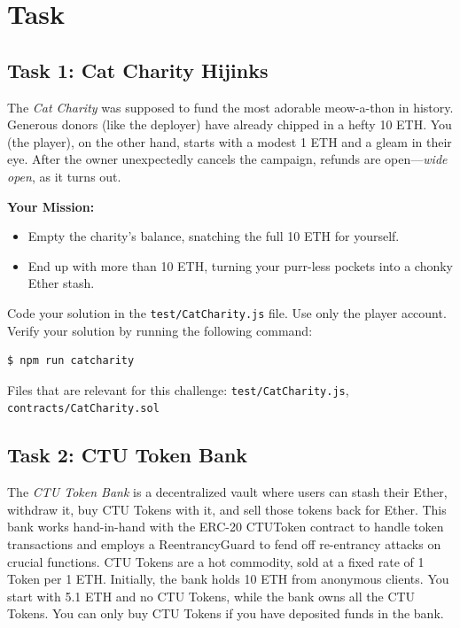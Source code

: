 \documentclass[12pt]{article}
\begin{document}
\section{Task}

\subsection*{Task 1: Cat Charity Hijinks}

The \emph{Cat Charity} was supposed to fund the most adorable meow-a-thon in history. Generous donors (like the deployer) have already chipped in a hefty 10 ETH. You (the player), on the other hand, starts with a modest 1 ETH and a gleam in their eye. After the owner unexpectedly cancels the campaign, refunds are open—\emph{wide open}, as it turns out. 

\medskip
\noindent
\textbf{Your Mission:}
\begin{itemize}
    \item Empty the charity's balance, snatching the full 10 ETH for yourself.
    \item End up with more than 10 ETH, turning your purr-less pockets into a chonky Ether stash.
\end{itemize}

\noindent
Code your solution in the \texttt{test/CatCharity.js} file. Use only the player account. Verify your solution by running the following command:

\begin{verbatim}
$ npm run catcharity
\end{verbatim}

\noindent
Files that are relevant for this challenge: \texttt{test/CatCharity.js}, \texttt{contracts/CatCharity.sol}

\subsection*{Task 2: CTU Token Bank}

The \emph{CTU Token Bank} is a decentralized vault where users can stash their Ether, withdraw it, buy CTU Tokens with it, and sell those tokens back for Ether. This bank works hand-in-hand with the ERC-20 CTUToken contract to handle token transactions and employs a ReentrancyGuard to fend off re-entrancy attacks on crucial functions. CTU Tokens are a hot commodity, sold at a fixed rate of 1 Token per 1 ETH. Initially, the bank holds 10 ETH from anonymous clients. You start with 5.1 ETH and no CTU Tokens, while the bank owns all the CTU Tokens. You can only buy CTU Tokens if you have deposited funds in the bank.
\end{document}
